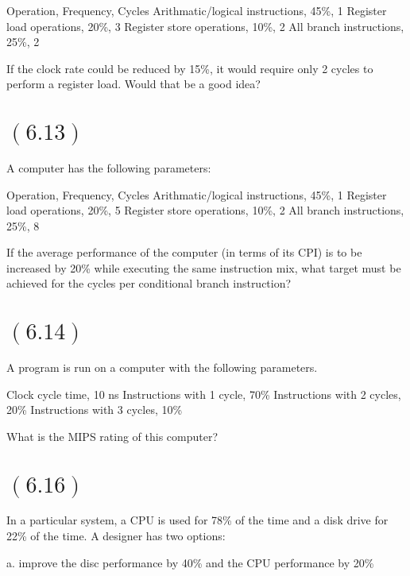 \documentclass[letterpaper,12pt,titlepage]{article}
\begin{document}
Operation, Frequency, Cycles
Arithmatic/logical instructions, 45\%, 1
Register load operations, 20\%, 3
Register store operations, 10\%, 2
All branch instructions, 25\%, 2

If the clock rate could be reduced by 15\%, it would require only 2 cycles to perform a register load. Would that be a good idea?

\begin{mdframed}[style=MyFrame]
\end{mdframed}

\section*{$(6.13)$} A computer has the following parameters:

Operation, Frequency, Cycles
Arithmatic/logical instructions, 45\%, 1
Register load operations, 20\%, 5
Register store operations, 10\%, 2
All branch instructions, 25\%, 8

If the average performance of the computer (in terms of its CPI) is to be increased by 20\% while executing the same instruction mix, what target must be achieved for the cycles per conditional branch instruction?

\begin{mdframed}[style=MyFrame]
\end{mdframed}

\section*{$(6.14)$} A program is run on a computer with the following parameters.

Clock cycle time, 10 ns
Instructions with 1 cycle, 70\%
Instructions with 2 cycles, 20\%
Instructions with 3 cycles, 10\%

What is the MIPS rating of this computer?

\begin{mdframed}[style=MyFrame]
\end{mdframed}

\section*{$(6.16)$} In a particular system, a CPU is used for 78\% of the time and a disk drive for 22\% of the time. A designer has two options:

a. improve the disc performance by 40\% and the CPU performance by 20\%
\end{document}
